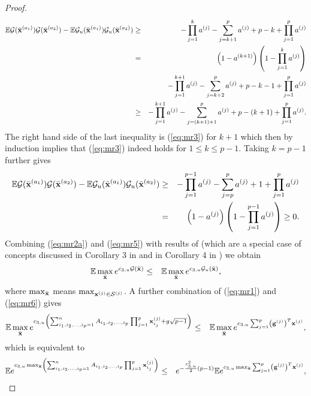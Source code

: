 \documentclass[10pt]{article}
\def\x{{\bf x}}
\def\x{{\mathbf x}}
\def\x{{\bf x}}
\def\x{{\bf x}}
\def\g{{\bf g}}
\def\mE{{\mathbb E}}
\def\lp{\left (}
\def\rp{\right )}
\def\x{{\bf x}}
\def\x{{\mathbf x}}
\def\x{{\bf x}}
\def\x{{\bf x}}
\def\g{{\bf g}}
\def\cS{{\mathcal S}}
\def\cG{{\mathcal G}}
\begin{document}
\begin{proof}
 \begin{eqnarray}
\label{eq:mr4}
  \mE \cG (\bar{\x}^{(a_1)})\cG (\bar{\x}^{(a_2)} )
 -
\mE \cG_u (\bar{\x}^{(a_1)})\cG_u (\bar{\x}^{(a_2)} )
 & \geq &  - \prod_{j=1}^{k} a^{(j)} -\sum_{j=k+1}^p
 a^{(j)}
 + p-k  +  \prod_{j=1}^{p} a^{(j)}
 \nonumber \\
 & = &  \lp 1 - a^{(k+1)}\rp \lp 1 - \prod_{j=1}^{k} a^{(j)} \rp
 \nonumber \\
& &  - \prod_{j=1}^{k+1} a^{(j)} -\sum_{j=k+2}^p
 a^{(j)}
 + p-k-1  +  \prod_{j=1}^{p} a^{(j)}
 \nonumber \\
& \geq &  - \prod_{j=1}^{k+1} a^{(j)} -\sum_{j=(k+1)+1}^p a^{(j)}
 + p-(k+1)  +  \prod_{j=1}^{p} a^{(j)}.
  \end{eqnarray}
The right hand side of the last inequality  is (\ref{eq:mr3})  for $k+1$ which then by induction implies that (\ref{eq:mr3}) indeed holds for $1\leq k\leq p-1$. Taking $k=p-1$ further gives
 \begin{eqnarray}
\label{eq:mr5}
  \mE \cG (\bar{\x}^{(a_1)})\cG (\bar{\x}^{(a_2)} )
 -
\mE \cG_u (\bar{\x}^{(a_1)})\cG_u (\bar{\x}^{(a_2)} )
 & \geq &  - \prod_{j=1}^{p-1} a^{(j)} -\sum_{j=p}^p
 a^{(j)}
 + 1  +  \prod_{j=1}^{p} a^{(j)}
\nonumber
\\
& = &
 \lp 1-a^{(j)}\rp \lp 1 - \prod_{j=1}^{p-1} a^{(j)} \rp
  \geq   0.
  \end{eqnarray}
Combining (\ref{eq:mr2a}) and (\ref{eq:mr5}) with results of \cite{Gordon85} (which are a special case of concepts discussed in Corollary 3 in \cite{Stojnicgscompyx16}  and in Corollary 4 in \cite{Stojnicgscomp16}) we obtain
\begin{eqnarray}
\label{eq:mr6}
  \mE \max_{\bar{\x}} e^{c_{3,u}\cG(\bar{\x})} &\leq &   \mE \max_{\bar{\x}} e^{c_{3,u}\cG_u(\bar{\x})},
\end{eqnarray}
where $\max_{\bar{\x}}$ means $\max_{\x^{(j)}\in \cS^{(j)}}$. A further combination of (\ref{eq:mr1}) and (\ref{eq:mr6}) gives
\begin{eqnarray}
\label{eq:mr7}
  \mE \max_{\bar{\x}} e^{c_{3,u}\lp \sum_{i_1,i_2,\dots,i_p=1}^n A_{i_1,i_2,\dots,i_p}\prod_{j=1}^{p}\x_{i_j}^{(j)}   + g\sqrt{p-1}   \rp  } &\leq &   \mE \max_{\bar{\x}} e^{c_{3,u} \sum_{j=1}^p \lp\g^{(j)}\rp^T\x^{(j)}   },
  \end{eqnarray}
which is equivalent to
\begin{eqnarray}
\label{eq:mr8}
   \mE e^{c_{3,u} \max_{\bar{\x}}  \lp \sum_{i_1,i_2,\dots,i_p=1}^n A_{i_1,i_2,\dots,i_p}\prod_{j=1}^{p}\x_{i_j}^{(j)}    \rp  } &\leq &  e^{-\frac{c_{3,u}^2}{2}(p-1) } \mE e^{c_{3,u}  \max_{\bar{\x}}  \sum_{j=1}^p \lp\g^{(j)}\rp^T\x^{(j)}   } ,

\end{eqnarray}
\end{proof}
\end{document}
